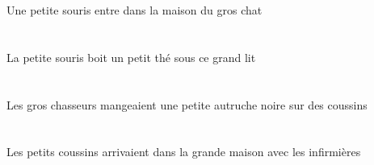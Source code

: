 \begin{exe}
Une petite souris entre dans la maison du gros chat
\ex\glll
\DEMSgObl{}   \grandDSg{}   \litDSgObl{}   \SOUS{}   \DEFSgErg{}   \petitBSg{}   \sourisBSgErg{}   \INDSgAbs{}   \petitBSg{}   \theBSgAbs{}  \boireVtPrsBSg{}\\
\DEMSgOblP{}   \grandDSgP{}   \litDSgOblP{}   \SOUSP{}   \DEFSgErgP{}   \petitBSgP{}   \sourisBSgErgP{}   \INDSgAbsP{}   \petitBSgP{}   \theBSgAbsP{}  \boireVtPrsBSgP{}\\
\DEMSgOblG{}   \grandDSgG{}   \litDSgOblG{}   \SOUSG{}   \DEFSgErgG{}   \petitBSgG{}   \sourisBSgErgG{}   \INDSgAbsG{}   \petitBSgG{}   \theBSgAbsG{}  \boireVtPrsBSgG{}\\
La petite souris boit un petit thé sous ce grand lit
\ex\glll
\INDPlObl{}   \coussinBPlObl{}   \SUR{}   \DEFPlErg{}   \grosCPl{}   \chasseurCPlErg{}   \INDSgAbs{}   \petitBSg{}   \noirBSg{}   \autrucheBSgAbs{}  \mangerVtPstBSg{}\\
\INDPlOblP{}   \coussinBPlOblP{}   \SURP{}   \DEFPlErgP{}   \grosCPlP{}   \chasseurCPlErgP{}   \INDSgAbsP{}   \petitBSgP{}   \noirBSgP{}   \autrucheBSgAbsP{}  \mangerVtPstBSgP{}\\
\INDPlOblG{}   \coussinBPlOblG{}   \SURG{}   \DEFPlErgG{}   \grosCPlG{}   \chasseurCPlErgG{}   \INDSgAbsG{}   \petitBSgG{}   \noirBSgG{}   \autrucheBSgAbsG{}  \mangerVtPstBSgG{}\\
Les gros chasseurs mangeaient une petite autruche noire sur des coussins
\ex\glll
\DEFPlObl{}   \infirmiereAPlObl{}   \AVEC{}   \DEFPlAbs{}   \petitBPl{}   \coussinBPlAbs{}    \DEFSgObl{}   \grandDSg{}   \maisonDSgObl{}   \DANS{}  \arriverViPstBPl{}\\
\DEFPlOblP{}   \infirmiereAPlOblP{}   \AVECP{}   \DEFPlAbsP{}   \petitBPlP{}   \coussinBPlAbsP{}    \DEFSgOblP{}   \grandDSgP{}   \maisonDSgOblP{}   \DANSP{}  \arriverViPstBPlP{}\\
\DEFPlOblG{}   \infirmiereAPlOblG{}   \AVECG{}   \DEFPlAbsG{}   \petitBPlG{}   \coussinBPlAbsG{}    \DEFSgOblG{}   \grandDSgG{}   \maisonDSgOblG{}   \DANSG{}  \arriverViPstBPlG{}\\
Les petits coussins arrivaient dans la grande maison avec les infirmières
\ex\glll
\DEFPlAbs{}   \grosCPl{}   \chasseurCPlAbs{}    \DEFPlObl{}   \grandDPl{}   \noirDPl{}   \tableDPlObl{}   \SOUS{}  \dormirViPrsCPl{}\\
\DEFPlAbsP{}   \grosCPlP{}   \chasseurCPlAbsP{}    \DEFPlOblP{}   \grandDPlP{}   \noirDPlP{}   \tableDPlOblP{}   \SOUSP{}  \dormirViPrsCPlP{}\\
\DEFPlAbsG{}   \grosCPlG{}   \chasseurCPlAbsG{}    \DEFPlOblG{}   \grandDPlG{}   \noirDPlG{}   \tableDPlOblG{}   \SOUSG{}  \dormirViPrsCPlG{}\\

\end{exe}
